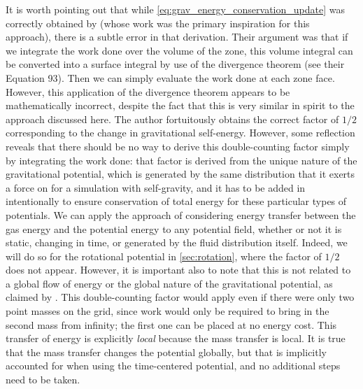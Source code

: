 \documentclass[iop]{../emulateapj}
\begin{document}
It is worth pointing out that while \autoref{eq:grav_energy_conservation_update} was correctly obtained 
by \cite{arepo} (whose work was the primary inspiration for this approach), there is a subtle error in that derivation. 
Their argument was that if we integrate the work done over the volume of the zone, this volume integral can be 
converted into a surface integral by use of the divergence theorem (see their Equation 93). Then we can simply 
evaluate the work done at each zone face. However, this application of the divergence theorem appears to be 
mathematically incorrect, despite the fact that this is very similar in spirit to the approach discussed here. 
The author fortuitously obtains the correct factor of $1/2$ corresponding to the change in gravitational self-energy.
However, some reflection reveals that there should be no way to derive this double-counting factor simply by integrating 
the work done: that factor is derived from the unique nature of the gravitational potential, which is generated 
by the same distribution that it exerts a force on for a simulation with self-gravity, and it has to be added in 
intentionally to ensure conservation of total energy for these particular types of potentials. We can apply 
the approach of considering energy transfer between the gas energy and the potential energy to any potential field, 
whether or not it is static, changing in time, or generated by the fluid distribution itself. 
Indeed, we will do so for the rotational potential in \autoref{sec:rotation}, where the 
factor of $1/2$ does not appear. However, it is important also to note that this is not related to a 
global flow of energy or the global nature of the gravitational potential, as claimed by \cite{marcello:2012}. 
This double-counting factor would apply even if there were only two point masses on the grid, since 
work would only be required to bring in the second mass from infinity; the first one can be 
placed at no energy cost. This transfer of energy is explicitly \textit{local} because the 
mass transfer is local. It is true that the mass transfer changes the potential globally, 
but that is implicitly accounted for when using the time-centered potential, and no 
additional steps need to be taken.
\end{document}
